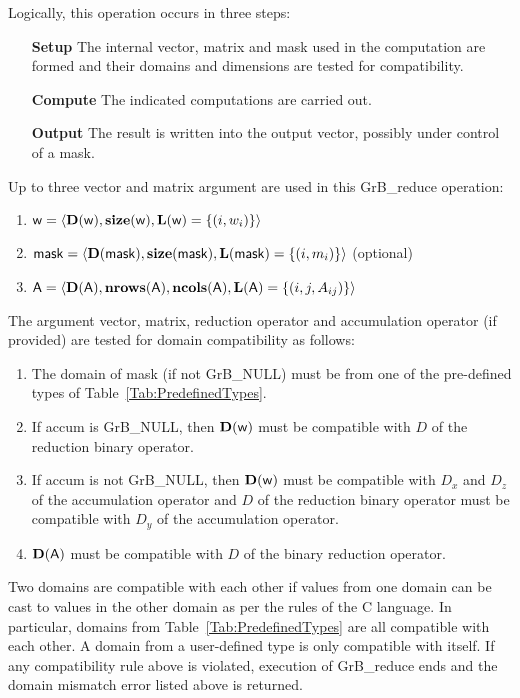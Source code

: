Logically, this operation occurs in three steps:
\begin{enumerate}[leftmargin=0.75in]
\item[\bf Setup] The internal vector, matrix and mask used in the computation are formed 
and their domains and dimensions are tested for compatibility.
\item[\bf Compute] The indicated computations are carried out.
\item[\bf Output] The result is written into the output vector, possibly under 
control of a mask.
\end{enumerate}

Up to three vector and matrix argument are used in this {\sf GrB\_reduce} operation:
\begin{enumerate}
	\item ${\sf w} = \langle \bold{D}({\sf w}),\bold{size}({\sf w}),
    \bold{L}({\sf w}) = \{(i,w_i) \} \rangle$

	\item ${\sf mask} = \langle \bold{D}({\sf mask}),\bold{size}({\sf mask}),
    \bold{L}({\sf mask}) = \{(i,m_i) \} \rangle$ (optional)

	\item ${\sf A} = \langle \bold{D}({\sf A}),\bold{nrows}({\sf A}),
    \bold{ncols}({\sf A}),\bold{L}({\sf A}) = \{(i,j,A_{ij}) \} \rangle$
\end{enumerate}

The argument vector, matrix, reduction operator and accumulation 
operator (if provided) are tested for domain compatibility as follows:
\begin{enumerate}
	\item The domain of {\sf mask} (if not {\sf GrB\_NULL}) must be from one of 
    the pre-defined types of Table~\ref{Tab:PredefinedTypes}.

	\item If {\sf accum} is {\sf GrB\_NULL}, then $\bold{D}({\sf w})$ must be 
    compatible with $D$ of the reduction binary operator.

	\item If {\sf accum} is not {\sf GrB\_NULL}, then $\bold{D}({\sf w})$ must be
    compatible with $D_x$ and $D_z$ of the accumulation operator and 
    $D$ of the reduction binary operator must be compatible with $D_y$ of the accumulation operator.

	\item $\bold{D}({\sf A})$ must be compatible with $D$ of the binary reduction operator.
\end{enumerate}
Two domains are compatible with each other if values from one domain can be cast 
to values in the other domain as per the rules of the C language.
In particular, domains from Table~\ref{Tab:PredefinedTypes} are all compatible 
with each other. A domain from a user-defined type is only compatible with itself.
If any compatibility rule above is violated, execution of {\sf GrB\_reduce} ends
and the domain mismatch error listed above is returned.

